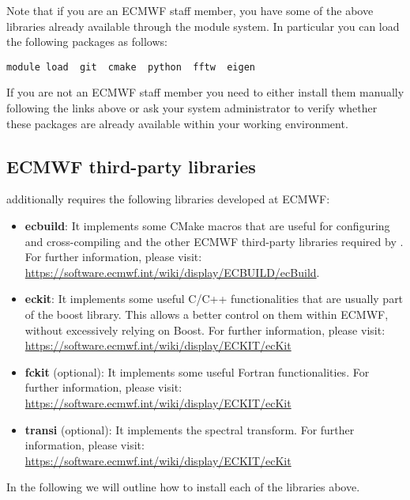 %
Note that if you are an ECMWF staff member, you have some of the above 
libraries already available through the module system. In particular 
you can load the following packages as follows:
%
\begin{lstlisting}[style=BashStyle]
module load  git  cmake  python  fftw  eigen
\end{lstlisting}
%
If you are not an ECMWF staff member you need to either install them 
manually following the links above or ask your system administrator 
to verify whether these packages are already available within your 
working environment.


\subsection{ECMWF third-party libraries}
\label{s:ecmwf-libs}
\Atlas additionally requires the following libraries developed 
at ECMWF:
%
\begin{itemize}
\item \textbf{ecbuild}: It implements some CMake macros that 
are useful for configuring and cross-compiling \Atlas and the 
other ECMWF third-party libraries required by \Atlas. 
For further information, please visit: 
\url{https://software.ecmwf.int/wiki/display/ECBUILD/ecBuild}.
\item \textbf{eckit}: It implements some useful C/C++ 
functionalities that are usually part of the boost library. 
This allows a better control on them within ECMWF, without 
excessively relying on Boost. For further information, please 
visit: \url{https://software.ecmwf.int/wiki/display/ECKIT/ecKit}
\item \textbf{fckit} (optional): It implements some useful 
Fortran functionalities. For further information, please 
visit: \url{https://software.ecmwf.int/wiki/display/ECKIT/ecKit}
\item \textbf{transi} (optional): It implements the spectral 
transform. For further information, please visit:
\url{https://software.ecmwf.int/wiki/display/ECKIT/ecKit}
\end{itemize}
%
In the following we will outline how to install each of the 
libraries above. 

